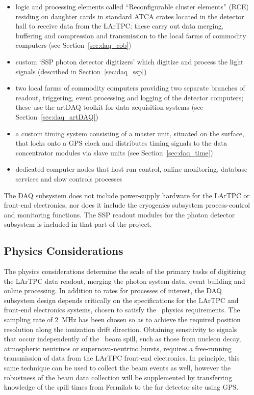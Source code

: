 \begin{itemize}
  \item logic and processing elements called ``Reconfigurable cluster
    elements'' (RCE) residing on daughter cards in standard ATCA crates located
    in the detector hall to receive data from the LArTPC; these carry
    out data merging, buffering and compression and transmission to the
    local farms of commodity computers (see Section~\ref{sec:daq_cob})
  \item custom `SSP photon detector digitizers' which digitize and
    process the light signals (described in Section~\ref{sec:daq_ssp}) 
  \item two local farms of commodity computers providing two separate
    branches of readout, triggering, event processing and logging of the
    detector computers; these use the artDAQ toolkit for data
    acquisition systems (see Section~\ref{sec:daq_artDAQ})
  \item a custom timing system consisting of a master unit, situated
    on the surface, that locks onto a GPS clock and distributes timing
    signals to the data concentrator modules via slave units (see
    Section~\ref{sec:daq_time})
  \item dedicated computer nodes that host run control, online
    monitoring, database services and slow controls processes
\end{itemize}
%
The DAQ subsystem does not include power-supply hardware for the
LArTPC or front-end electronics, nor does it include the cryogenics
subsystem process-control and monitoring functions.  The SSP readout
modules for the photon detector subsystem is %
included in that part of
the project.

\subsection{Physics Considerations}
\label{sec:daq_phys}

The physics considerations determine the scale of the primary tasks of
digitizing the LArTPC data readout, merging the photon system data,
event building and online processing.  In addition to rates for
processes of interest, the DAQ subsystem design depends critically on
the specifications for the LArTPC and front-end electronics systems,
chosen to satisfy the \LBNE\ physics requirements.  The sampling rate
of 2~MHz has been chosen so as to achieve the required position
resolution along the ionization drift direction. Obtaining sensitivity
to signals that occur independently of the \LBNE\ beam spill, such as
those from nucleon decay, atmospheric neutrinos or supernova-neutrino
bursts, requires a free-running transmission of data from the LArTPC
front-end electronics.  In principle, this same technique can be used
to collect the beam events as well, however  the
robustness of the beam data collection will be supplemented by transferring knowledge of
the spill times from Fermilab to the far detector site using GPS.


